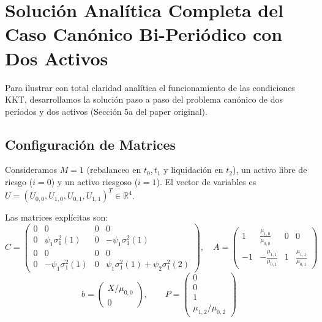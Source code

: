 \documentclass[11pt,a4paper]{report}
\numberwithin{equation}{chapter}
\begin{document}
\section{Solución Analítica Completa del Caso Canónico Bi-Periódico con Dos Activos}

Para ilustrar con total claridad analítica el funcionamiento de las condiciones KKT, desarrollamos la solución paso a paso del problema canónico de dos períodos y dos activos (Sección 5a del paper original).

\subsection{Configuración de Matrices}
Consideramos $M=1$ (rebalanceo en $t_0, t_1$ y liquidación en $t_2$), un activo libre de riesgo ($i=0$) y un activo riesgoso ($i=1$). El vector de variables es $U = (U_{0,0}, U_{1,0}, U_{0,1}, U_{1,1})^T \in \mathbb{R}^4$.

Las matrices explícitas son:
\begin{equation}
    C = \begin{pmatrix}
        0 & 0 & 0 & 0 \\
        0 & \psi_1 \sigma_1^2(1) & 0 & -\psi_1 \sigma_1^2(1) \\
        0 & 0 & 0 & 0 \\
        0 & -\psi_1 \sigma_1^2(1) & 0 & \psi_1 \sigma_1^2(1) + \psi_2 \sigma_1^2(2)
    \end{pmatrix}, \quad
    A = \begin{pmatrix}
        1 & \frac{\mu_{1,0}}{\mu_{0,0}} & 0 & 0 \\[1ex]
        -1 & -\frac{\mu_{1,1}}{\mu_{0,1}} & 1 & \frac{\mu_{1,1}}{\mu_{0,1}}
    \end{pmatrix}
\end{equation}
\begin{equation}
    b = \begin{pmatrix} X/\mu_{0,0} \\ 0 \end{pmatrix}, \qquad
    P = \begin{pmatrix} 0 \\ 0 \\ 1 \\ \mu_{1,2}/\mu_{0,2} \end{pmatrix}
\end{equation}
\end{document}
